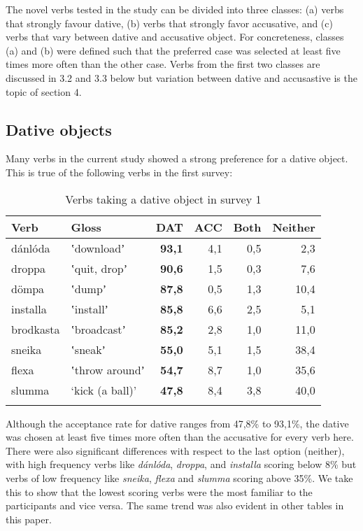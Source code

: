 \documentclass[output=paper,modfonts,nonflat]{langsci/langscibook}
\begin{document}
The novel verbs tested in the study can be divided into three classes: (a) verbs that strongly favour dative, (b) verbs that strongly favor accusative, and (c) verbs that vary between dative and accusative object. For concreteness, classes (a) and (b) were defined such that the preferred case was selected at least five times more often than the other case. Verbs from the first two classes are discussed in 3.2 and 3.3 below but variation between dative and accusastive is the topic of section 4.

\subsection{Dative objects} %

Many verbs in the current study showed a strong preference for a dative object. This is true of the following verbs in the first survey: 

\begin{table}
\caption{\label{tab:jonsson:1}Verbs taking a dative object in survey 1}
\begin{tabularx}{\textwidth}{XXrrrr}
\lsptoprule
Verb & Gloss & \textbf{DAT} & ACC & Both & Neither\\
\midrule
dánlóda & ʽdownloadʼ & \textbf{93,1} & 4,1 & 0,5 & 2,3\\
droppa & ʽquit, dropʼ & \textbf{90,6} & 1,5 & 0,3 & 7,6\\
dömpa & ʽdumpʼ & \textbf{87,8} & 0,5 & 1,3 & 10,4\\
installa & ʽinstallʼ & \textbf{85,8} & 6,6 & 2,5 & 5,1\\
brodkasta & ʽbroadcastʼ & \textbf{85,2} & 2,8 & 1,0 & 11,0\\
sneika & ʽsneakʼ & \textbf{55,0} & 5,1 & 1,5 & 38,4\\
flexa & ʽthrow aroundʼ & \textbf{54,7} & 8,7 & 1,0 & 35,6\\
slumma & ‘kick (a ball)’ & \textbf{47,8} & 8,4 & 3,8 & 40,0\\
\lspbottomrule
\end{tabularx}
\end{table}

Although the acceptance rate for dative ranges from 47,8\% to 93,1\%, the dative was chosen at least five times more often than the accusative for every verb here. There were also significant differences with respect to the last option (neither), with high frequency verbs like \textit{dánlóda}, \textit{droppa}, and \textit{installa} scoring below 8\% but verbs of low frequency like \textit{sneika}, \textit{flexa} and \textit{slumma} scoring above 35\%. We take this to show that the lowest scoring verbs were the most familiar to the participants and vice versa. The same trend was also evident in other tables in this paper.
\end{document}
